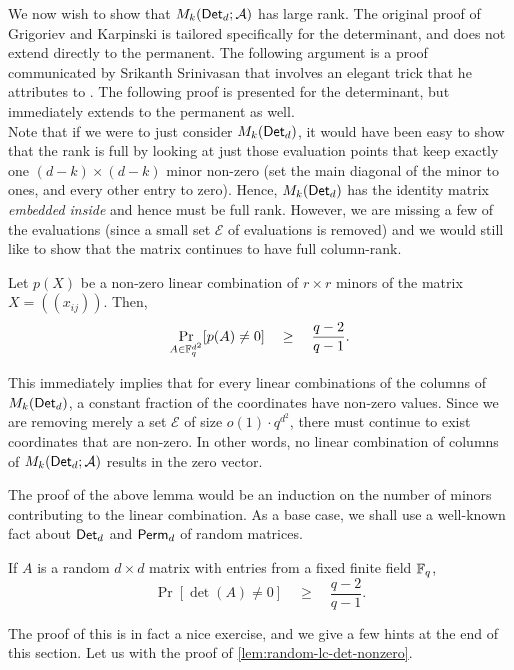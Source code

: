 We now wish to show that $M_k(\operatorname{\mathsf{Det}}_d;\mathcal{A})$ has large rank. 
The
original proof of Grigoriev and Karpinski is tailored specifically for
the determinant, and does not extend directly to the permanent. 
The
following argument is a proof communicated by Srikanth Srinivasan
\cite{Srikanth13} that involves an elegant trick that he attributes to
\cite{Koutis08}. 
The following proof is presented for the determinant,
but immediately extends to the permanent as well. \\


Note that if we were to just consider $M_k(\operatorname{\mathsf{Det}}_d)$, it would have
been easy to show that the rank is full by looking at just those
evaluation points that keep exactly one $(d-k)\times (d-k)$ minor
non-zero (set the main diagonal of the minor to ones, and every other
entry to zero). 
Hence, $M_k(\operatorname{\mathsf{Det}}_d)$ has the identity matrix
\emph{embedded inside} and hence must be full rank. 
However, we are
missing a few of the evaluations (since a small set $\mathcal{E}$ of
evaluations is removed) and we would still like to show that the
matrix continues to have full column-rank.

\begin{lemma}\label{lem:random-lc-det-nonzero}
  Let $p(X)$ be a non-zero linear combination of $r\times r$
  minors of the matrix $X = (\!(x_{ij})\!)$. 
Then, 
  $$
  \Pr_{A\in \mathbb{F}_q^{d^2}}[p(A) \neq 0] \quad \geq \quad \frac{q-2}{q-1}.
  $$
\end{lemma}

This immediately implies that for every linear combinations of the
columns of $M_k(\operatorname{\mathsf{Det}}_d)$, a constant fraction of the coordinates have
non-zero values. 
Since we are removing merely a set $\mathcal{E}$ of
size $o(1) \cdot q^{d^2}$, there must continue to exist coordinates that
are non-zero. 
In other words, no linear combination of columns of
$M_k(\operatorname{\mathsf{Det}}_d;\mathcal{A})$ results in the zero vector.


The proof of the above lemma would be an induction on the number of
minors contributing to the linear combination. 
As a base case, we
shall use a well-known fact about $\operatorname{\mathsf{Det}}_d$ and $\operatorname{\mathsf{Perm}}_d$ of random
matrices.

\begin{proposition}\label{prop:random-det-nonzero}
  If $A$ is a random $d\times d$ matrix with entries from a fixed
  finite field $\mathbb{F}_q$, 
$$
\Pr[\det(A) \neq 0] \quad\geq\quad \frac{q-2}{q-1}.
$$
\end{proposition}

The proof of this is in fact a nice exercise, and we give a few hints
at the end of this section. 
Let us with the proof of
\autoref{lem:random-lc-det-nonzero}.

